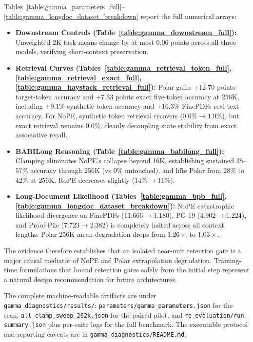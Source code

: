 Tables~\ref{table:gamma_parameters_full}--\ref{table:gamma_longdoc_dataset_breakdown} report the full numerical arrays:
\begin{itemize}
  \item \textbf{Downstream Controls (Table~\ref{table:gamma_downstream_full}):} Unweighted 2K task means change by at most $0.06$ points across all three models, verifying short-context preservation.
  \item \textbf{Retrieval Curves (Tables~\ref{table:gamma_retrieval_token_full}, \ref{table:gamma_retrieval_exact_full}, \ref{table:gamma_haystack_retrieval_full}):} Polar gains $+12.70$ points target-token accuracy and $+7.33$ points exact five-token accuracy at 256K, including $+9.1\%$ synthetic token accuracy and $+16.3\%$ FinePDFs real-text accuracy. For NoPE, synthetic token retrieval recovers ($0.6\% \rightarrow 1.9\%$), but exact retrieval remains $0.0\%$, cleanly decoupling state stability from exact associative recall.
  \item \textbf{BABILong Reasoning (Table~\ref{table:gamma_babilong_full}):} Clamping eliminates NoPE's collapse beyond 16K, establishing sustained $35$--$57\%$ accuracy through 256K (vs $0\%$ untouched), and lifts Polar from $28\%$ to $42\%$ at 256K. RoPE decreases slightly ($14\% \rightarrow 11\%$).
  \item \textbf{Long-Document Likelihood (Tables~\ref{table:gamma_bpb_full}, \ref{table:gamma_longdoc_dataset_breakdown}):} NoPE catastrophic likelihood divergence on FinePDFs ($11.666 \rightarrow 1.180$), PG-19 ($4.902 \rightarrow 1.224$), and Proof-Pile ($7.723 \rightarrow 2.382$) is completely halted across all context lengths. Polar 256K mean degradation drops from $1.26\times$ to $1.03\times$.
\end{itemize}



The evidence therefore establishes that an isolated near-unit retention gate is a major causal mediator of NoPE and Polar extrapolation degradation. Training-time formulations that bound retention gates safely from the initial step represent a natural design recommendation for future architectures.

The complete machine-readable artifacts are under \texttt{gamma\_diagnostics/results/}: \texttt{parameters/gamma\_parameters.json} for the scan, \texttt{all\_clamp\_sweep\_262k.json} for the paired pilot, and \texttt{re\_evaluation/run-summary.json} plus per-suite logs for the full benchmark. The executable protocol and reporting caveats are in \texttt{gamma\_diagnostics/README.md}.

